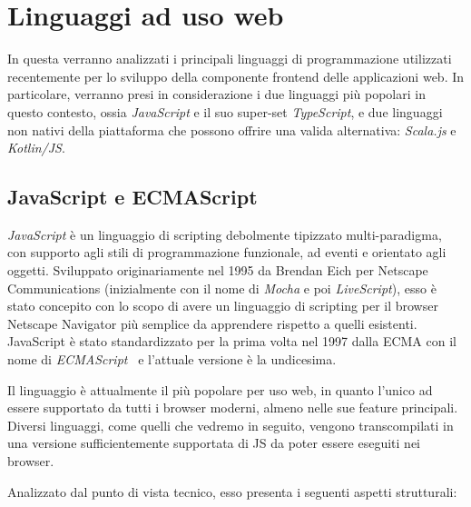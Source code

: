  \section{Linguaggi ad uso web}\label{sec:lang}
    In questa  verranno analizzati i principali linguaggi di programmazione utilizzati recentemente per lo sviluppo della componente frontend delle applicazioni web.
    In particolare, verranno presi in considerazione i due linguaggi più popolari in questo contesto, ossia \emph{JavaScript} e il suo super-set \emph{TypeScript}, e due linguaggi non nativi della piattaforma che possono offrire una valida alternativa:
    \emph{Scala.js} e \emph{Kotlin/JS}\@.

    \subsection{JavaScript e ECMAScript}\label{subsec:js}


      \emph{JavaScript} è un linguaggio di scripting debolmente tipizzato multi-paradigma, con supporto agli stili di programmazione funzionale, ad eventi e orientato agli oggetti.
      Sviluppato originariamente nel 1995 da Brendan Eich per Netscape Communications (inizialmente con il nome di \emph{Mocha} e poi \emph{LiveScript}),
      esso è stato concepito con lo scopo di avere un linguaggio di scripting per il browser Netscape Navigator più semplice da apprendere rispetto a quelli esistenti.
      JavaScript è stato standardizzato per la prima volta nel 1997 dalla ECMA con il nome di \emph{ECMAScript}~\cite{ISO:1998,ECMA-262} e l'attuale versione è la undicesima.

      Il linguaggio è attualmente il più popolare per uso web, in quanto l'unico ad essere supportato da tutti i browser moderni, almeno nelle sue feature principali.
      Diversi linguaggi, come quelli che vedremo in seguito, vengono transcompilati in una versione sufficientemente supportata di JS da poter essere eseguiti nei browser.

      Analizzato dal punto di vista tecnico, esso presenta i seguenti aspetti strutturali:

